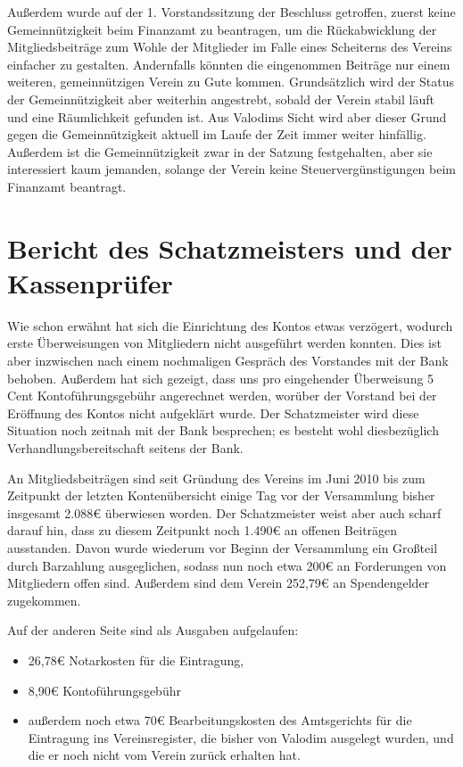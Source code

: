 \documentclass[a4paper,12pt]{scrartcl}
\begin{document}
Außerdem wurde auf der 1. Vorstandssitzung der Beschluss getroffen, zuerst keine
Gemeinnützigkeit beim Finanzamt zu beantragen, um die Rückabwicklung der
Mitgliedsbeiträge zum Wohle der Mitglieder im Falle eines Scheiterns des
Vereins einfacher zu gestalten. Andernfalls könnten die eingenommen Beiträge nur
einem weiteren, gemeinnützigen Verein zu Gute kommen. Grundsätzlich wird der
Status der Gemeinnützigkeit aber weiterhin angestrebt, sobald der Verein stabil
läuft und eine Räumlichkeit gefunden ist. Aus Valodims Sicht wird aber dieser
Grund gegen die Gemeinnützigkeit aktuell im Laufe der Zeit immer weiter
hinfällig. Außerdem ist die Gemeinnützigkeit zwar in der Satzung festgehalten,
aber sie interessiert kaum jemanden, solange der Verein keine
Steuervergünstigungen beim Finanzamt beantragt.

\section{Bericht des Schatzmeisters und der Kassenprüfer}
Wie schon erwähnt hat sich die Einrichtung des Kontos etwas verzögert, wodurch
erste Überweisungen von Mitgliedern nicht ausgeführt werden konnten. Dies ist
aber inzwischen nach einem nochmaligen Gespräch des Vorstandes mit der Bank
behoben. Außerdem hat sich gezeigt, dass uns pro eingehender Überweisung 5 Cent
Kontoführungsgebühr angerechnet werden, worüber der Vorstand bei der Eröffnung
des Kontos nicht aufgeklärt wurde. Der Schatzmeister wird diese Situation noch
zeitnah mit der Bank besprechen; es besteht wohl diesbezüglich
Verhandlungsbereitschaft seitens der Bank.

An Mitgliedsbeiträgen sind seit Gründung des Vereins im Juni 2010 bis zum
Zeitpunkt der letzten Kontenübersicht einige Tag vor der Versammlung bisher
insgesamt 2.088€ überwiesen worden. Der Schatzmeister weist aber auch scharf
darauf hin, dass zu diesem Zeitpunkt noch 1.490€ an offenen Beiträgen
ausstanden. Davon wurde wiederum vor Beginn der Versammlung ein Großteil durch
Barzahlung ausgeglichen, sodass nun noch etwa 200€ an Forderungen von
Mitgliedern offen sind. Außerdem sind dem Verein 252{,}79€ an Spendengelder
zugekommen.

Auf der anderen Seite sind als Ausgaben aufgelaufen:
\begin{itemize}
  \item 26{,}78€ Notarkosten für die Eintragung,
  \item 8{,}90€ Kontoführungsgebühr
  \item außerdem noch etwa 70€ Bearbeitungskosten des Amtsgerichts für die
    Eintragung ins Vereinsregister, die bisher von Valodim ausgelegt wurden, und
    die er noch nicht vom Verein zurück erhalten hat.
\end{itemize}
\end{document}
